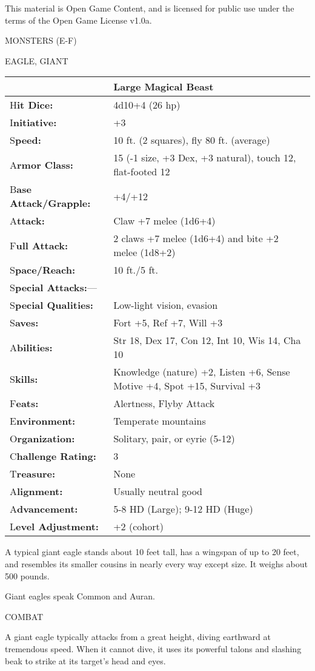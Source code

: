 \documentclass{article}
\begin{document}
This material is Open Game Content, and is licensed for public use under the terms 
of the Open Game License v1.0a.

{\LARGE{}MONSTERS (E-F)}

\vspace{12pt}
{\LARGE{}EAGLE, GIANT}

\begin{tabular}{|>{\raggedright}p{91pt}|>{\raggedright}p{231pt}|}
\hline
  & Large Magical Beast\tabularnewline
\hline
H\textbf{it Dice:} & 4d10+4 (26 hp)\tabularnewline
\hline
I\textbf{nitiative:} & +3\tabularnewline
\hline
S\textbf{peed:} & 10 ft. (2 squares), fly 80 ft. (average)\tabularnewline
\hline
A\textbf{rmor Class:} & 15 (-1 size, +3 Dex, +3 natural), touch 12, flat-footed 
12\tabularnewline
\hline
B\textbf{ase Attack/Grapple:} & +4/+12\tabularnewline
\hline
A\textbf{ttack:} & Claw +7 melee (1d6+4)\tabularnewline
\hline
F\textbf{ull Attack:} & 2 claws +7 melee (1d6+4) and bite +2 melee (1d8+2)\tabularnewline
\hline
S\textbf{pace/Reach:} & 10 ft./5 ft.\tabularnewline
\hline
S\textbf{pecial Attacks:}--- & \tabularnewline
\hline
S\textbf{pecial Qualities:} & Low-light vision, evasion\tabularnewline
\hline
S\textbf{aves:} & Fort +5, Ref +7, Will +3\tabularnewline
\hline
A\textbf{bilities:} & Str 18, Dex 17, Con 12, Int 10, Wis 14, Cha 10\tabularnewline
\hline
S\textbf{kills:} & Knowledge (nature) +2, Listen +6, Sense Motive +4, Spot +15, 
Survival +3\tabularnewline
\hline
F\textbf{eats:} & Alertness, Flyby Attack\tabularnewline
\hline
E\textbf{nvironment:} & Temperate mountains\tabularnewline
\hline
O\textbf{rganization:} & Solitary, pair, or eyrie (5-12)\tabularnewline
\hline
C\textbf{hallenge Rating:} & 3\tabularnewline
\hline
T\textbf{reasure:} & None\tabularnewline
\hline
A\textbf{lignment:} & Usually neutral good\tabularnewline
\hline
A\textbf{dvancement:} & 5-8 HD (Large); 9-12 HD (Huge)\tabularnewline
\hline
L\textbf{evel Adjustment:} & +2 (cohort)\tabularnewline
\hline
\end{tabular}

A typical giant eagle stands about 10 feet tall, has a wingspan of up to 20 feet, 
and resembles its smaller cousins in nearly every way except size. It weighs about 
500 pounds.

Giant eagles speak Common and Auran.

COMBAT

A giant eagle typically attacks from a great height, diving earthward at tremendous 
speed. When it cannot dive, it uses its powerful talons and slashing beak to strike 
at its target's head and eyes.
\end{document}

